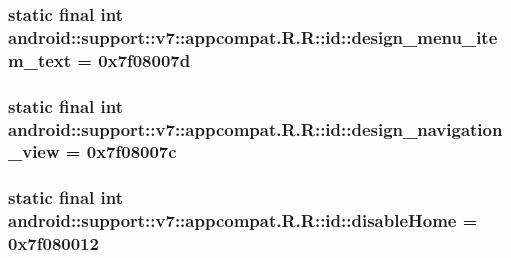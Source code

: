 \hypertarget{classandroid_1_1support_1_1v7_1_1appcompat_1_1_r_1_1id_ec565093a96a1d830f975c621f398684}{
\subsubsection[{design\_\-menu\_\-item\_\-text}]{\setlength{\rightskip}{0pt plus 5cm}static final int android::support::v7::appcompat.R.R::id::design\_\-menu\_\-item\_\-text = 0x7f08007d}}
\label{classandroid_1_1support_1_1v7_1_1appcompat_1_1_r_1_1id_ec565093a96a1d830f975c621f398684}


\hypertarget{classandroid_1_1support_1_1v7_1_1appcompat_1_1_r_1_1id_6e2f0a7f7c13f7ab73b5faccbb8224dd}{
\subsubsection[{design\_\-navigation\_\-view}]{\setlength{\rightskip}{0pt plus 5cm}static final int android::support::v7::appcompat.R.R::id::design\_\-navigation\_\-view = 0x7f08007c}}
\label{classandroid_1_1support_1_1v7_1_1appcompat_1_1_r_1_1id_6e2f0a7f7c13f7ab73b5faccbb8224dd}


\hypertarget{classandroid_1_1support_1_1v7_1_1appcompat_1_1_r_1_1id_e7bc01fd735c7410e6b8b43e5ebed4d6}{
\subsubsection[{disableHome}]{\setlength{\rightskip}{0pt plus 5cm}static final int android::support::v7::appcompat.R.R::id::disableHome = 0x7f080012}}
\label{classandroid_1_1support_1_1v7_1_1appcompat_1_1_r_1_1id_e7bc01fd735c7410e6b8b43e5ebed4d6}


